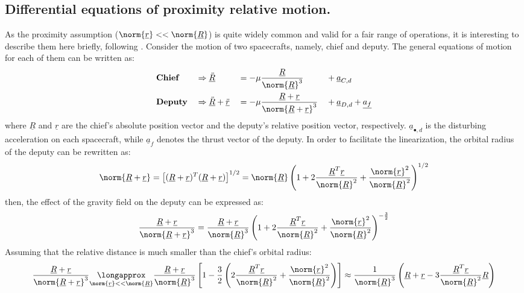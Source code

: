 	\subsection{Differential equations of proximity relative motion.} \label{sec: Diff_eqs_prox}
	\indent As the proximity assumption ($\norm{\underline{r}} <<\norm{\underline{R}}$) is quite widely common and valid for a fair range of operations, it is interesting to describe them here briefly, following \cite{Yamanaka_Ankersen}. Consider the motion of two spacecrafts, namely, chief and deputy. The general equations of motion for each of them can be written as:
	\begin{alignat}{4}
	&\textbf{Chief} 		&& \Rightarrow   \underline{\ddot{R}}   && = - \mu \dfrac{\underline{R}}{\norm{\underline{R}}^{3}} &&+ \underline{a}_{C, d} \label{eqCh2:chief_eq} \\
	&\textbf{Deputy} 		&& \Rightarrow   \underline{\ddot{R}} + \underline{\ddot{r}}  && =  - \mu \dfrac{\underline{R} + \underline{r}}{\norm{\underline{R} + \underline{r}}^{3}} && + \underline{a}_{D, d} + \underline{a_f}  \label{eqCh2:deputy_eq}
	\end{alignat}
	\noindent where $\underline{R}$ and $\underline{r}$ are the chief's absolute position vector and the deputy's relative position vector, respectively. $\underline{a}_{\bullet, d}$ is the disturbing acceleration on each spacecraft, while $\underline{a}_f$ denotes the thrust vector of the deputy. In order to facilitate the linearization, the orbital radius of the deputy can be rewritten as:
	\[
	\norm{\underline{R} + \underline{r}} = \left[ (\underline{R} + \underline{r})^T (\underline{R} + \underline{r}) \right]^{1/2} = \norm{\underline{R}} \left( 1 + 2 \dfrac{\underline{R}^T \underline{r}}{\norm{\underline{R}}^2} + \dfrac{\norm{\underline{r}}^2}{\norm{\underline{R}}^2} \right)^{1/2}
	\]
	\noindent then, the effect of the gravity field on the deputy can be expressed as:
	\[
	\dfrac{\underline{R} + \underline{r}}{\norm{\underline{R} + \underline{r}}^{3}} = \dfrac{\underline{R} + \underline{r}}{\norm{\underline{R}}^{3}}  \left( 1 + 2 \dfrac{\underline{R}^T \underline{r}}{\norm{\underline{R}}^2} + \dfrac{\norm{\underline{r}}^2}{\norm{\underline{R}}^2} \right)^{-\frac{3}{2}}
	\]
	\indent Assuming that the relative distance is much smaller than the chief's orbital radius:
	\begin{equation}
	\dfrac{\underline{R} + \underline{r}}{\norm{\underline{R} + \underline{r}}^{3}} \underset{\tiny{\norm{\underline{r}} << \norm{\underline{R}}}}{\longapprox} \dfrac{\underline{R} + \underline{r}}{\norm{\underline{R}}^{3}} \left[1 - \frac{3}{2} \left( 2 \dfrac{\underline{R}^T \underline{r}}{\norm{\underline{R}}^2} + \dfrac{\norm{\underline{r}}^2}{\norm{\underline{R}}^2} \right) \right] \approx  \dfrac{1}{\norm{\underline{R}}^{3}} \left(\underline{R} + \underline{r} - 3 \dfrac{\underline{R}^T \underline{r}}{\norm{\underline{R}}^2} \underline{R} \right)
	\label{eqCh2: 	Rplusr}
	\end{equation}
